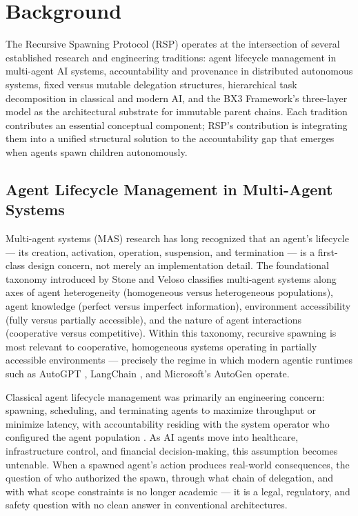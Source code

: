 \section{Background}
\label{sec:rs-background}

The Recursive Spawning Protocol (RSP) operates at the intersection of several established research and engineering traditions: agent lifecycle management in multi-agent AI systems, accountability and provenance in distributed autonomous systems, fixed versus mutable delegation structures, hierarchical task decomposition in classical and modern AI, and the BX3 Framework's three-layer model as the architectural substrate for immutable parent chains. Each tradition contributes an essential conceptual component; RSP's contribution is integrating them into a unified structural solution to the accountability gap that emerges when agents spawn children autonomously.

\subsection{Agent Lifecycle Management in Multi-Agent Systems}

Multi-agent systems (MAS) research has long recognized that an agent's lifecycle --- its creation, activation, operation, suspension, and termination --- is a first-class design concern, not merely an implementation detail. The foundational taxonomy introduced by Stone and Veloso \cite{stone2000} classifies multi-agent systems along axes of agent heterogeneity (homogeneous versus heterogeneous populations), agent knowledge (perfect versus imperfect information), environment accessibility (fully versus partially accessible), and the nature of agent interactions (cooperative versus competitive). Within this taxonomy, recursive spawning is most relevant to cooperative, homogeneous systems operating in partially accessible environments --- precisely the regime in which modern agentic runtimes such as AutoGPT \cite{autoGPT2023}, LangChain \cite{langchain2023}, and Microsoft's AutoGen \cite{autogen2023} operate.

Classical agent lifecycle management was primarily an engineering concern: spawning, scheduling, and terminating agents to maximize throughput or minimize latency, with accountability residing with the system operator who configured the agent population \cite{bansal2019}. As AI agents move into healthcare, infrastructure control, and financial decision-making, this assumption becomes untenable. When a spawned agent's action produces real-world consequences, the question of who authorized the spawn, through what chain of delegation, and with what scope constraints is no longer academic --- it is a legal, regulatory, and safety question with no clean answer in conventional architectures.

